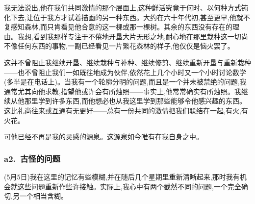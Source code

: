 \dmark{}我无法说出,他在我们共同激情的那个层面上,这种鲜活究竟于何时、以何种方式钝化下去,让位于我方才试着描画的另一种东西。大约在六十年代初,甚至更早,他就不复感知森林,而只肯看见他合意的这一棵或那一棵树。其余的东西没有存在的理由。我想,看到我那样专注于不倦地开垦大片无形之地,耐心地在那里栽种这一切尚不像任何东西的事物,一副已经看见一片繁花森林的样子,他仅仅是恼火罢了。

这并不曾阻止我继续开垦、继续栽种与补种、继续修剪、继续重新开垦与重新栽种——也不曾阻止我们一如既往地成为伙伴,依然花上几个小时又一个小时讨论数学(多半是在电话上)。当我有一个轮廓分明的问题,而且是一个并未被禁绝的问题,我通常尤其向他求教,指望他或许会有所烛照——事实上,他常常确实有所烛照。我继续从他那里学到许多东西,而他想必也从我这里学到那些能够令他感兴趣的东西。这比礼尚往来或互通有无更好——总有一份共同的激情把我们联结在一起,有火,有火花。

可他已经不再是我的灵感的源泉。这源泉如今唯有在我自身之中。

\subsubsection*{a2.~古怪的问题}



(5月5日)我在这里的记忆有些模糊,并在随后几个星期里重新清晰起来,那时我有机会就这些问题重新作些许接触。实际上,我心中有两个截然不同的问题,一个完全确切,另一个相当含糊。

